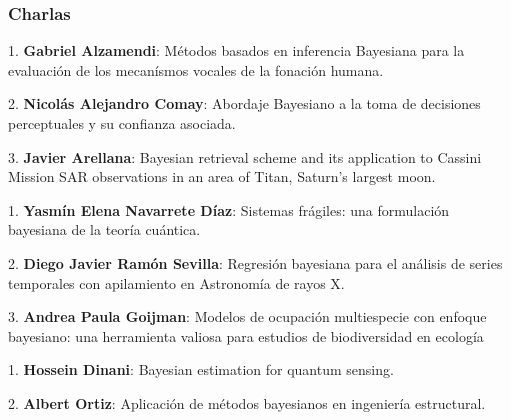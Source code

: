 \documentclass[a4paper,11pt]{book}
\theoremstyle{definition}
\begin{document}
\subsubsection{Charlas}

\justify
{}

\vspace{0.2cm}

\hspace{0.6cm} 1.  \textbf{Gabriel Alzamendi}: Métodos basados en inferencia Bayesiana para la evaluación de los mecanísmos vocales de la fonación humana.

\hspace{0.6cm} 2. \textbf{Nicolás Alejandro Comay}: Abordaje Bayesiano a la toma de decisiones perceptuales y su confianza 	asociada.

\hspace{0.6cm} 3. \textbf{Javier Arellana}: Bayesian retrieval scheme and its application to Cassini Mission SAR observations in an area of Titan, Saturn's largest moon.


\vspace{0.6cm}


\vspace{0.2cm}



\hspace{0.6cm} 1. \textbf{Yasmín Elena Navarrete Díaz}: Sistemas frágiles: una formulación bayesiana de la teoría cuántica.


\hspace{0.6cm} 2. \textbf{Diego Javier Ramón Sevilla}: Regresión bayesiana para el análisis de series temporales con apilamiento en Astronomía de rayos X.

\hspace{0.6cm} 3. \textbf{Andrea Paula Goijman}: Modelos de ocupación multiespecie con enfoque bayesiano: una herramienta valiosa para estudios de biodiversidad en ecología

\justify \vspace{0.6cm}


\vspace{0.2cm}


\hspace{0.6cm} 1. \textbf{Hossein Dinani}: Bayesian estimation for quantum sensing.


\hspace{0.6cm} 2. \textbf{Albert Ortiz}: Aplicación de métodos bayesianos en ingeniería estructural.
\end{document}
